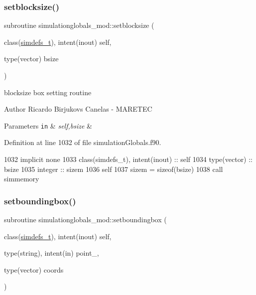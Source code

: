 \subsubsection{\texorpdfstring{setblocksize()}{setblocksize()}}
{\footnotesize\ttfamily subroutine simulationglobals\+\_\+mod\+::setblocksize (\begin{DoxyParamCaption}\item[{class(\mbox{\hyperlink{structsimulationglobals__mod_1_1simdefs__t}{simdefs\+\_\+t}}), intent(inout)}]{self,  }\item[{type(vector)}]{bsize }\end{DoxyParamCaption})\hspace{0.3cm}{\ttfamily [private]}}



blocksize box setting routine 

\begin{DoxyAuthor}{Author}
Ricardo Birjukovs Canelas -\/ M\+A\+R\+E\+T\+EC 
\end{DoxyAuthor}

\begin{DoxyParams}[1]{Parameters}
\mbox{\tt in}  & {\em self,bsize} & \\
\hline
\end{DoxyParams}


Definition at line 1032 of file simulation\+Globals.\+f90.


\begin{DoxyCode}
1032     \textcolor{keywordtype}{implicit none}
1033     \textcolor{keywordtype}{class}(simdefs\_t), \textcolor{keywordtype}{intent(inout)} :: self
1034     \textcolor{keywordtype}{type}(vector) :: bsize
1035     \textcolor{keywordtype}{integer} :: sizem
1036     self%
1037     sizem = sizeof(bsize)
1038     \textcolor{keyword}{call }simmemory%
\end{DoxyCode}
\mbox{\label{namespacesimulationglobals__mod_abf5afcc12763caab3a5fc394255ced44}} 
\subsubsection{\texorpdfstring{setboundingbox()}{setboundingbox()}}
{\footnotesize\ttfamily subroutine simulationglobals\+\_\+mod\+::setboundingbox (\begin{DoxyParamCaption}\item[{class(\mbox{\hyperlink{structsimulationglobals__mod_1_1simdefs__t}{simdefs\+\_\+t}}), intent(inout)}]{self,  }\item[{type(string), intent(in)}]{point\+\_\+,  }\item[{type(vector)}]{coords }\end{DoxyParamCaption})\hspace{0.3cm}{\ttfamily [private]}}



